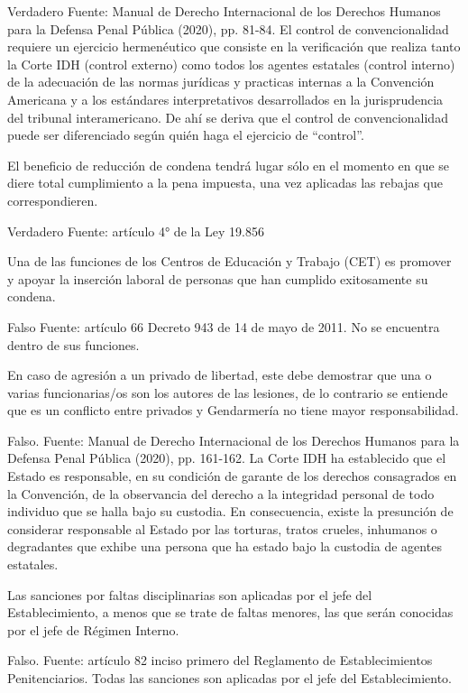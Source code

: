 \documentclass[letterpaper, 11pt]{article}
\begin{document}
Verdadero
Fuente: Manual de Derecho Internacional de los Derechos Humanos para la Defensa Penal
Pública (2020), pp. 81-84. El control de convencionalidad requiere un ejercicio
hermenéutico que consiste en la verificación que realiza tanto la Corte IDH (control
externo) como todos los agentes estatales (control interno) de la adecuación de las
normas jurídicas y practicas internas a la Convención Americana y a los estándares
interpretativos desarrollados en la jurisprudencia del tribunal interamericano. De ahí se
deriva que el control de convencionalidad puede ser diferenciado según quién haga el
ejercicio de “control”.

El beneficio de reducción de condena tendrá lugar sólo en el momento en que se diere
total cumplimiento a la pena impuesta, una vez aplicadas las rebajas que
correspondieren.

Verdadero
Fuente: artículo 4° de la Ley 19.856

Una de las funciones de los Centros de Educación y Trabajo (CET) es promover y apoyar
la inserción laboral de personas que han cumplido exitosamente su condena.

Falso
Fuente: artículo 66 Decreto 943 de 14 de mayo de 2011. No se encuentra dentro de sus
funciones.

En caso de agresión a un privado de libertad, este debe demostrar que una o varias
funcionarias/os son los autores de las lesiones, de lo contrario se entiende que es un
conflicto entre privados y Gendarmería no tiene mayor responsabilidad.

Falso.
Fuente: Manual de Derecho Internacional de los Derechos Humanos para la Defensa Penal
Pública (2020), pp. 161-162. La Corte IDH ha establecido que el Estado es responsable, en
su condición de garante de los derechos consagrados en la Convención, de la observancia
del derecho a la integridad personal de todo individuo que se halla bajo su custodia. En
consecuencia, existe la presunción de considerar responsable al Estado por las torturas,
tratos crueles, inhumanos o degradantes que exhibe una persona que ha estado bajo la
custodia de agentes estatales.

Las sanciones por faltas disciplinarias son aplicadas por el jefe del Establecimiento, a
menos que se trate de faltas menores, las que serán conocidas por el jefe de Régimen
Interno.

Falso.
Fuente: artículo 82 inciso primero del Reglamento de Establecimientos Penitenciarios.
Todas las sanciones son aplicadas por el jefe del Establecimiento.
\end{document}
